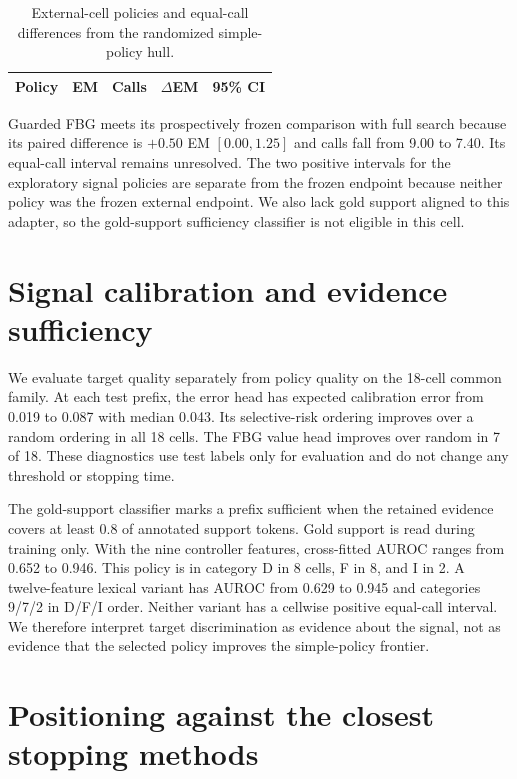 \documentclass[manuscript,nonacm]{acmart}
\begin{document}
\begin{table}[htbp]
\caption{External-cell policies and equal-call differences from the randomized
simple-policy hull.}
\label{tab:supp-external}
\small
\begin{tabular}{lrrrl}
\toprule
Policy & EM & Calls & $\Delta$EM & 95\% CI \\
\midrule

\bottomrule
\end{tabular}
\end{table}

Guarded FBG meets its prospectively frozen comparison with full search because
its paired difference is $+0.50$ EM $[0.00,1.25]$ and calls fall from 9.00 to
7.40. Its equal-call interval remains unresolved. The two positive intervals
for the exploratory signal policies are separate from the frozen endpoint
because neither policy was the frozen
external endpoint. We also lack gold support aligned to this adapter, so the
gold-support sufficiency classifier is not eligible in this cell.


\section{Signal calibration and evidence sufficiency}
\label{supp:signal-audit}

We evaluate target quality separately from policy quality on the 18-cell common
family. At each test prefix, the error head has expected calibration error from
0.019 to 0.087 with median 0.043. Its selective-risk ordering improves over a
random ordering in all 18 cells. The FBG value head improves over random in 7
of 18. These diagnostics use test labels only for evaluation and do not change
any threshold or stopping time.

The gold-support classifier marks a prefix sufficient when the retained
evidence covers at least 0.8 of annotated support tokens. Gold support is read
during training only. With the nine controller features, cross-fitted AUROC
ranges from 0.652 to 0.946. This policy is in category D in 8 cells, F in 8,
and I in 2. A twelve-feature lexical variant has AUROC from 0.629 to 0.945 and
categories 9/7/2 in D/F/I order. Neither variant has a cellwise positive
equal-call interval. We therefore interpret target discrimination as evidence
about the signal, not as evidence that the selected policy improves the
simple-policy frontier.

\section{Positioning against the closest stopping methods}
\label{supp:related}
\end{document}
